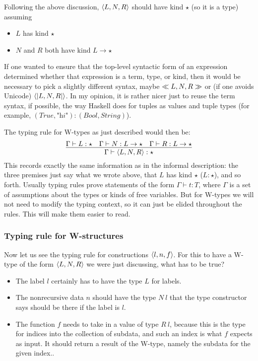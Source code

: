 \documentclass{article}
\begin{document}
Following the above discussion, $\langle L , N , R \rangle$ should have kind $\star$
(so it is a type) assuming
\begin{itemize}
\item $L$ has kind $\star$
\item $N$ and $R$ both have kind $L \to \star$
\end{itemize}

\noindent If one wanted to ensure that the top-level syntactic form of an expression
determined whether that expression is a term, type, or kind, then it would be necessary
to pick a slightly different syntax, maybe $\ll L , N , R \gg$ or (if one avoids Unicode) $\langle| L , N , R |\rangle$.
In my opinion, it is rather nicer just to reuse the term syntax, if possible, the way
Haskell does for tuples as values and tuple types (for example, $(\textit{True},\textit{"hi"}) : (\textit{Bool},\textit{String})$).

The typing rule for W-types as just described would then be:
\[
\infer{ \Gamma \vdash \w{L}{N}{R} : \star}{\Gamma \vdash L : \star & \Gamma \vdash N : L \to \star  & \Gamma \vdash R : L \to \star }
\]
\noindent This records exactly the same information as in the informal
description: the three premises just say what we wrote above, that $L$
has kind $\star$ ($L : \star$), and so forth.  Usually typing rules
prove statements of the form $\Gamma \vdash t : T$, where $\Gamma$ is
a set of assumptions about the types or kinds of free variables.  But
for W-types we will not need to modify the typing context, so it can
just be elided throughout the rules.  This will make them easier to
read.

\subsubsection{Typing rule for W-structures}

Now let us see the typing rule for constructions $\langle l , n, f \rangle$.  For this
to have a W-type of the form $\langle L , N , R \rangle$ we were just discussing, what has
to be true?

\begin{itemize}
\item The label $l$ certainly has to have the type $L$ for labels.
\item The nonrecursive data $n$ should have the type $N\ l$ that
  the type constructor says should be there if the label is $l$.
\item The function $f$ needs to take in a value of type $R\ l$,
  because this is the type for indices into the collection of subdata,
  and such an index is what $f$ expects as input. It should return a
  result of the W-type, namely the subdata for the given index..
\end{itemize}
\end{document}
